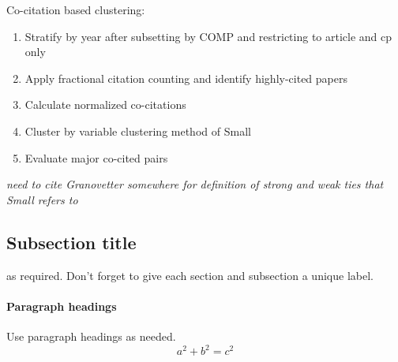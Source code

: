 \noindent
Co-citation based clustering:
\begin{enumerate}
\item Stratify by year after subsetting by COMP and restricting to article and cp only
\item Apply fractional citation counting and identify highly-cited papers
\item Calculate normalized co-citations
\item Cluster by variable clustering method of Small
\item Evaluate major co-cited pairs
\end{enumerate}


\emph{need to cite Granovetter somewhere for definition of strong and weak ties that Small refers to}




%
%




\clearpage



\subsection{Subsection title}
\label{sec:2}
as required. Don't forget to give each section
and subsection a unique label.
\paragraph{Paragraph headings} Use paragraph headings as needed.
\begin{equation}
a^2+b^2=c^2
\end{equation}

